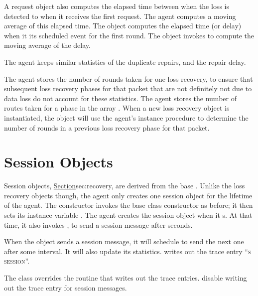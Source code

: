 A request object also computes the elapsed time between 
when the loss is detected to when it receives the first request.
The agent computes a moving average of this elapsed time.
The object computes the elapsed time (or delay) when it
its scheduled event for the first round.
The object invokes
to compute the moving average of the delay.

The agent keeps similar statistics of the duplicate repairs,
and the repair delay.

The agent stores the number of rounds taken for one loss recovery,
to ensure that subsequent loss recovery phases for that packet
that are not definitely not due to data loss
do not account for these statistics.
The agent stores the number of routes taken for a phase in
the array .
When a new loss recovery object is instantiated,
the object will use the agent's instance procedure
to determine the number of rounds in a previous loss recovery phase
for that packet.

\section{Session Objects}
\label{sec:session}

Session objects,
\href{like the loss recovery objects}{Section}{sec:recovery},
are derived from the base .
Unlike the loss recovery objects though,
the agent only creates one session object for the lifetime of the agent.
The constructor invokes the base class constructor as before;
it then sets its instance variable .
The agent creates the session object when it s.
At that time, it also invokes
,
to send a session message after  seconds.

When the object sends a session message,
it will schedule to send the next one after some interval.
It will also update its statistics.
writes out the trace entry ``\textsc{s session}''.

The class overrides the
 routine that writes out the trace entries.
disable writing out the trace entry for session messages.

